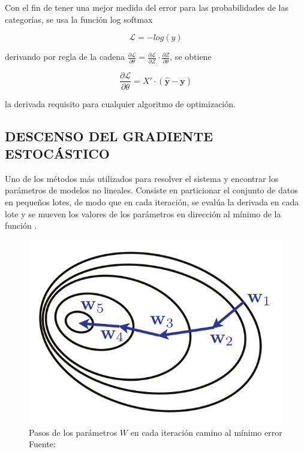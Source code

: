         Con el fin de tener una mejor medida del error para las probabilidades de las categorías, se usa la función log softmax
        
        \begin{equation}
            \mathcal{L} = -log(\hat{y})
        \end{equation}
        
        \noindent derivando por regla de la cadena $\frac{\partial\mathcal{L}}{\partial \theta} = \frac{\partial\mathcal{L}}{\partial Z} \cdot \frac{\partial Z}{\partial \theta}$, se obtiene
        
        \begin{equation}
            \frac{\partial\mathcal{L}}{\partial \theta} = X' \cdot (\mathbf{\hat{y}} - \mathbf{y})
        \end{equation}
        
        \noindent la derivada requisito para cualquier algoritmo de optimización.
        
    \subsection{DESCENSO DEL GRADIENTE ESTOCÁSTICO}
        Uno de los métodos más utilizados para resolver el sistema y encontrar los parámetros de modelos no lineales. Consiste en particionar el conjunto de datos en pequeños lotes, de modo que en cada iteración, se evalúa la derivada en cada lote y se mueven los valores de los parámetros en dirección al mínimo de la función \citep{hastie01statisticallearning}.
        
        \begin{figure}[H]
            \centering
            \includegraphics[scale=0.38]{imagenes/sgd}
            \caption[Pasos de los parámetros $W$ en cada iteración camino al mínimo error]{Pasos de los parámetros $W$ en cada iteración camino al mínimo error\\ Fuente: \citep{10.5555/3360093}}
        \end{figure}
      
